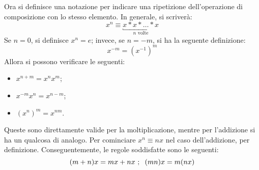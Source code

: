 \documentclass[11pt, a4paper]{scrartcl}
\theoremstyle{definition}
\numberwithin{esempio}{section}
\theoremstyle{definition}
\numberwithin{obs}{section}
\numberwithin{nota}{section}
\numberwithin{equation}{subsection}
\begin{document}
Ora si definisce una notazione per indicare una ripetizione dell'operazione di composizione con lo stesso elemento. In generale, si scriver\`a:
\begin{equation}
	x^ n \equiv \underbracket{x *x *\ldots *x}_{n \text{ volte}}
\end{equation}
Se $n=0$, si definisce $x^n = e$; invece, se $n=-m$, si ha la seguente definizione:
\[
x^{-m} = (x^{-1} )^m
\] 
Allora si possono verificare le seguenti:
\begin{itemize}
	\item $x^{n+m} = x^n x^m$;
	\item $x^{-m} x^n = x^{n-m} $;
	\item $(x^n)^m = x^{nm} $.
\end{itemize}
Queste sono direttamente valide per la moltiplicazione, mentre per l'addizione si ha un qualcosa di analogo.
Per cominciare $x^n \equiv nx$ nel caso dell'addizione, per definizione.
Conseguentemente, le regole soddisfatte sono le seguenti:
\[
	(m+n) x = mx + nx \ ; \hspace{.2cm} (mn)x = m(nx)
\] 
\end{document}

